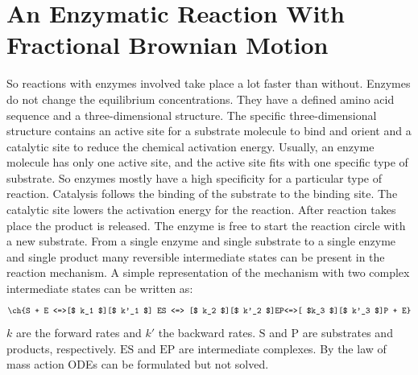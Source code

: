 \documentclass[
  a4paper,BCOR10mm,oneside,
  headsepline,footsepline,%
  fleqn,openbib
]{scrbook}
\begin{document}
\chapter{An Enzymatic Reaction With Fractional Brownian Motion}

So reactions with enzymes involved take place a lot faster than without. Enzymes do not change the equilibrium concentrations. They have a defined amino acid sequence and a three-dimensional structure. The specific three-dimensional structure contains an active site for a substrate molecule to bind and orient and a catalytic site to reduce the chemical activation energy. Usually, an enzyme molecule has only one active site, and the active site fits with one specific type of substrate. So enzymes mostly have a high specificity for a particular type of reaction. Catalysis follows the binding of the substrate to the binding site. The catalytic site lowers the activation energy for the reaction. After reaction takes place the product is released. The enzyme is free to start the reaction circle with a new substrate. From a single enzyme and single substrate to a single enzyme and single product many reversible intermediate states can be present in the reaction mechanism. A simple representation of the mechanism with two complex intermediate states can be written as:
\begin{align} \label{eq:enyzmescheme}
\ch{S + E <=>[$ k_1 $][$ k'_1 $] ES <=> [$ k_2 $][$ k'_2 $]EP<=>[ $k_3 $][$ k'_3 $]P + E}
\end{align}
$k$ are the forward rates and $k'$ the backward rates. $\mathrm{S}$ and $\mathrm{P}$ are substrates and products, respectively. $\mathrm{ES}$ and $\mathrm{EP}$ are intermediate complexes. By the law of mass action ODEs can be formulated but not solved.\par
\end{document}
